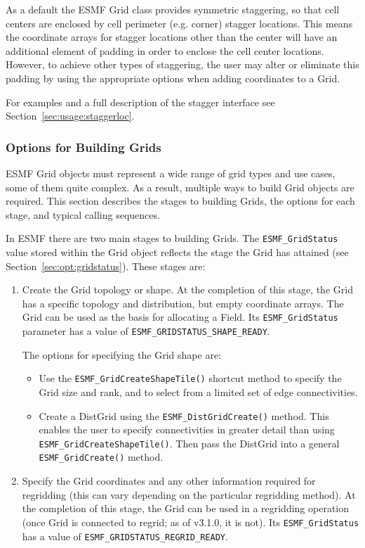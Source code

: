 As a default the ESMF Grid class provides symmetric staggering, so
that cell centers are enclosed by cell perimeter (e.g. corner) 
stagger locations. This means the coordinate arrays for stagger
locations other than the center will have an additional element of 
padding in order to enclose the cell center locations.
However, to achieve other types of staggering, the user may alter 
or eliminate this padding by using the appropriate options when adding
coordinates to a Grid. 
 
For examples and a full description of the stagger interface 
see Section~\ref{sec:usage:staggerloc}. 

\subsubsection{Options for Building Grids}
\label{sec:gridcreateoptions}

ESMF Grid objects must represent a wide range of grid types 
and use cases, some of them quite complex.  As a result, multiple
ways to build Grid objects are required.  This section describes
the stages to building Grids, the options for each stage, and 
typical calling sequences.

In ESMF there are two main stages to building Grids.  The
{\tt ESMF\_GridStatus} value stored within the Grid object reflects
the stage the Grid has attained (see Section~\ref{sec:opt:gridstatus}).
These stages are:

\begin{enumerate}

\item Create the Grid topology or shape.  At the completion of this
stage, the Grid has a specific topology and distribution, but
empty coordinate arrays.  The Grid can be used as the basis for
allocating a Field. Its {\tt ESMF\_GridStatus} parameter has 
a value of {\tt ESMF\_GRIDSTATUS\_SHAPE\_READY}.  

The options for specifying the Grid shape are:
\begin{itemize}
\item Use the {\tt ESMF\_GridCreateShapeTile()} shortcut method to 
specify the Grid size and rank, and to select from a limited set
of edge connectivities.   
\item Create a DistGrid using the {\tt ESMF\_DistGridCreate()}
method.  This enables the user to specify connectivities in 
greater detail than using {\tt ESMF\_GridCreateShapeTile()}.  Then
pass the DistGrid into a general {\tt ESMF\_GridCreate()} method.
\end{itemize}

\item Specify the Grid coordinates and any other information
required for regridding (this can vary depending on the particular
regridding method).  At the completion of this stage, the Grid can
be used in a regridding operation (once Grid is connected to regrid;
as of v3.1.0, it is not).  Its {\tt ESMF\_GridStatus}
has a value of {\tt ESMF\_GRIDSTATUS\_REGRID\_READY}.
\end{enumerate}

